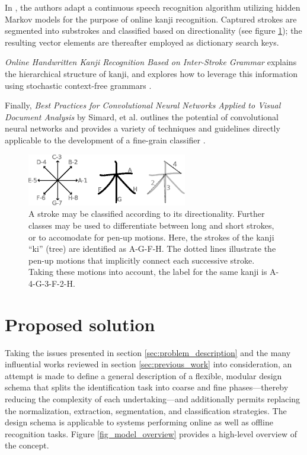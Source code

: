 \documentclass[10pt,conference,a4paper]{IEEEtran}
\begin{document}
	In \cite{nakai2001substroke}, the authors adapt a continuous speech recognition algorithm utilizing
	hidden Markov models for the purpose of online kanji recognition. Captured strokes are segmented into
	substrokes and classified based on directionality (see figure \ref{fig_stroke_categories});
	the resulting vector elements are thereafter employed as dictionary search keys.


	\emph{Online Handwritten Kanji Recognition Based on Inter-Stroke Grammar} explains the hierarchical structure of kanji,
	and explores how to leverage this information using stochastic context-free grammars \cite{ota2007online}.

	Finally, \emph{Best Practices for Convolutional Neural Networks Applied to Visual Document Analysis} by Simard, et al. outlines the
	potential of convolutional neural networks and provides a variety of techniques and guidelines directly applicable to the development of a fine-grain classifier \cite{simard2003best}.


	\begin{figure}
		\centering
		\includegraphics[width=2.75in]{./fig/stroke-categories.eps}
		\caption{A stroke may be classified according to its directionality.
			Further classes may be used to differentiate between long and short strokes,
		or to accomodate for pen-up motions. Here, the strokes of the kanji ``ki'' (tree) are identified as A-G-F-H.
		The dotted lines illustrate the pen-up motions that implicitly connect each successive stroke. Taking these motions into account,
		the label for the same kanji is A-4-G-3-F-2-H.}
		\label{fig_stroke_categories}
	\end{figure}



	\section{Proposed solution}
	\label{sec:proposed_solution}

	Taking the issues presented in section \ref{sec:problem_description} and the many influential works reviewed in section \ref{sec:previous_work}
	into consideration, an attempt is made to define a general description of a flexible, modular 
	design schema that splits the identification task into coarse and fine phases---thereby reducing the complexity of each undertaking---and 
	additionally permits replacing the normalization, extraction, segmentation, and classification strategies.
	The design schema is applicable to systems performing online as well as offline recognition tasks.
	Figure \ref{fig_model_overview} provides a high-level overview of the concept.
\end{document}
